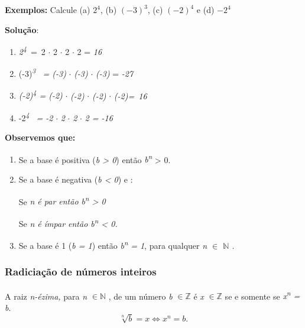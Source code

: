 \textbf{Exemplos: }
Calcule (a) $2^4$, (b) $(-3)^3$, (c) $(-2)^4$ e (d) $-2^4$

\textbf{Solução}: 
\begin{enumerate}[label=\alph*]
    \item \textit{2\textsuperscript{4}}~=~2 $ \cdot $  2 $ \cdot $  2  $ \cdot $  2  = \textit{16}

    \item (-3)\textit{\textsuperscript{3}~ = (-3)} $ \cdot $  \textit{(-3)} $ \cdot $  \textit{(-3)} = \textit{-27}

    \item \textit{(-2)\textsuperscript{4} = (-2)} $ \cdot $  \textit{(-2)} $ \cdot $  \textit{(-2)} $ \cdot $  \textit{(-2)=~16  }

    \item -2\textit{\textsuperscript{4}~ = -2 }$ \cdot $  \textit{2} $ \cdot $  \textit{2} $ \cdot $ \textit{2 = -16}
\end{enumerate}

\textbf{Observemos que:}
\begin{caixa}
\begin{enumerate}
	\item Se a base é positiva (\textit{b > 0}) então \textit{b\textsuperscript{n}} > 0.

	\item Se a base é negativa (\textit{b < 0}) e :

    \quad Se \textit{n é par então b\textsuperscript{n} > 0}

    \quad Se \textit{n é ímpar então b\textsuperscript{n} < 0.}

	\item Se a base é 1 (\textit{b = 1}) então \textit{b\textsuperscript{n}} \textit{= 1}, para qualquer \textit{n $ \in $   \( \mathbb{N} \) .} 
\end{enumerate}
\end{caixa}

\subsubsection{Radiciação de números inteiros}
 
\begin{caixa}
    \begin{tdefinicao}
        A raiz \textit{n-ézima, }para\textit{ n }  \(\in \mathbb{\mathbb{N}} \)  , de um número \textit{b}   \(\in \mathbb{Z} \) é \textit{x}   \(\in \mathbb{Z} \)  se e somente se \textit{x\textsuperscript{n} = b}.
        \[ \sqrt[n]{b}=x \Longleftrightarrow   x^{n}=b. \]
    \end{tdefinicao}
\end{caixa}

